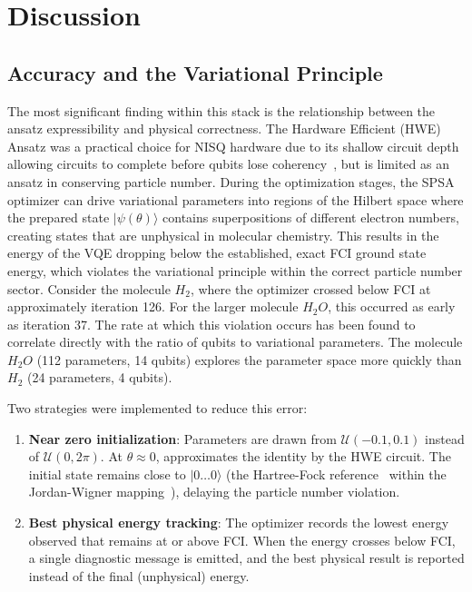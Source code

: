 \section{Discussion}
\subsection{Accuracy and the Variational Principle}
\label{sec:hwe_limitation}
The most significant finding within this stack is the relationship between the ansatz expressibility and physical 
correctness. The Hardware Efficient (HWE) Ansatz was a practical choice for NISQ hardware due to its shallow circuit depth 
allowing circuits to complete before qubits lose coherency~\parencite{kandala2017hardware}, but is limited as an ansatz in conserving particle number. 
During the optimization stages, the SPSA optimizer can drive variational parameters into regions of the Hilbert space
where the prepared state $|\psi(\theta)\rangle$ contains superpositions of different electron numbers, creating states that are
unphysical in molecular chemistry. This results in the energy of the VQE dropping below the established, exact FCI ground state energy, 
which violates the variational principle within the correct particle number sector. Consider the molecule $H_{2}$, where the  
optimizer crossed below FCI at approximately iteration 126. For the larger molecule $H_{2}O$, this occurred as early as iteration 37. The rate 
at which this violation occurs has been found to correlate directly with the ratio of qubits to variational parameters. The molecule 
$H_{2}O$ (112 parameters, 14 qubits) explores the parameter space more quickly than $H_{2}$ (24 parameters, 4 qubits).

Two strategies were implemented to reduce this error:
\begin{enumerate}
    \item \textbf{Near zero initialization}: Parameters are drawn from $\mathcal{U}(-0.1, 0.1)$ instead of $\mathcal{U}(0, 2\pi)$. At $\theta \approx 0$, approximates the identity by the HWE circuit. The initial state remains close to $|0\ldots0\rangle$ (the Hartree-Fock reference~\parencite{szabo1996modernquantumchemistry} within the Jordan-Wigner mapping~\parencite{peruzzo2014variational}), delaying the particle number violation.

    \item \textbf{Best physical energy tracking}: The optimizer records the lowest energy observed that remains at or above FCI. When the energy crosses below FCI, a single diagnostic message is emitted, and the best physical result is reported instead of the final (unphysical) energy.
\end{enumerate}

